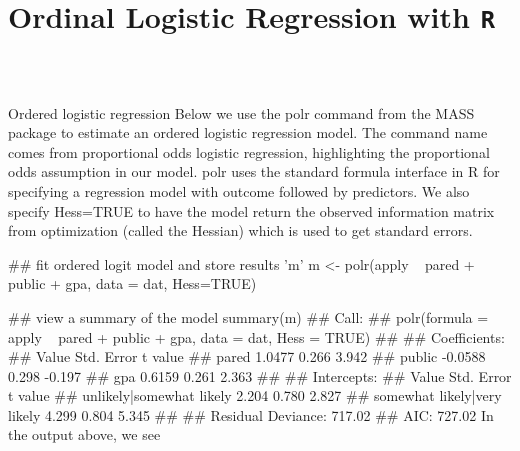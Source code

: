 \documentclass[00-GLMregression.tex]{subfiles}
\begin{document}
\newpage
\Large

\section{Ordinal Logistic Regression with \texttt{R}}
\begin{framed}		
\begin{verbatim}



\end{verbatim}	
\end{framed}
	
Ordered logistic regression
Below we use the polr command from the MASS package to estimate an ordered logistic regression model. The command name comes from proportional odds logistic regression, highlighting the proportional odds assumption in our model. polr uses the standard formula interface in R for specifying a regression model with outcome followed by predictors. We also specify Hess=TRUE to have the model return the observed information matrix from optimization (called the Hessian) which is used to get standard errors.

## fit ordered logit model and store results 'm'
m <- polr(apply ~ pared + public + gpa, data = dat, Hess=TRUE)

## view a summary of the model
summary(m)
## Call:
## polr(formula = apply ~ pared + public + gpa, data = dat, Hess = TRUE)
## 
## Coefficients:
##          Value Std. Error t value
## pared   1.0477      0.266   3.942
## public -0.0588      0.298  -0.197
## gpa     0.6159      0.261   2.363
## 
## Intercepts:
##                             Value  Std. Error t value
## unlikely|somewhat likely     2.204  0.780      2.827 
## somewhat likely|very likely  4.299  0.804      5.345 
## 
## Residual Deviance: 717.02 
## AIC: 727.02
In the output above, we see
\end{document}
